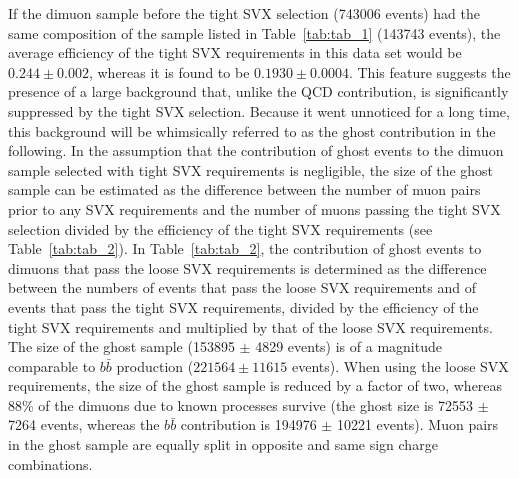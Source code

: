\documentclass[aps,prd,preprint,floatfix,nofootinbib,superscriptaddress,showpacs,amssymb]{revtex4}
\begin{document}
 If the dimuon sample before the tight SVX selection (743006 events) had
 the same composition of the sample listed in Table~\ref{tab:tab_1} 
(143743 events), the average efficiency of the tight SVX requirements in
 this data set would be $0.244\pm0.002$, whereas it is found to be 
 $0.1930\pm0.0004$. This feature suggests the presence of a large
 background
 that, unlike the QCD contribution, is significantly suppressed by the 
 tight SVX selection.
 Because it went unnoticed for a long time, this background will be
 whimsically referred
 to as the ghost contribution in the following.
 In the assumption that the contribution of ghost
 events to the dimuon sample selected with tight SVX
 requirements is negligible, the size of the ghost sample can be estimated as
 the difference between the number of muon pairs prior to any SVX 
 requirements and the number of muons passing the tight SVX selection
 divided by the efficiency of the tight SVX requirements (see
 Table~\ref{tab:tab_2}). In Table~\ref{tab:tab_2}, the contribution of
 ghost events to dimuons that pass the loose SVX
 requirements is determined as the difference between the numbers of
 events that pass the loose SVX requirements and of events that pass 
 the tight SVX requirements, divided by the efficiency of the tight SVX
 requirements and multiplied by that of the loose SVX requirements.
 The size of the ghost sample (153895 $\pm$ 4829 events) is of
 a magnitude comparable to $b\bar{b}$ production ($221564 \pm 11615$ events).
 When using the loose SVX requirements, the size of the ghost
 sample is reduced by a factor of two, whereas 88\% of the dimuons
 due to known processes survive (the ghost size is 72553 $\pm$ 7264 events,
 whereas the $b\bar{b}$ contribution is 194976 $\pm$ 10221 events).  
 Muon pairs in the ghost sample are equally split in opposite
 and same sign charge combinations. 
\end{document}
